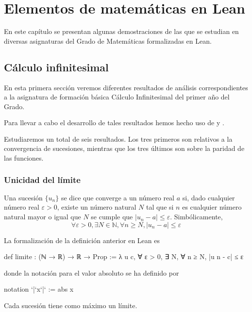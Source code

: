 \chapter{Elementos de matemáticas en Lean}

En este capítulo se presentan algunas demostraciones de las que se
estudian en diversas asignaturas del Grado de Matemáticas formalizadas
en Lean.

\section{Cálculo infinitesimal}

En esta primera sección veremos diferentes resultados de análisis
correspondientes a la asignatura de formación básica Cálculo
Infinitesimal del primer año del Grado.

Para llevar a cabo el desarrollo de tales resultados hemos hecho uso
de \cite{ML} y \cite{LP}.

Estudiaremos un total de seis resultados. Los tres primeros son relativos
a la convergencia de sucesiones, mientras que los tres últimos son sobre
la paridad de las funciones.

  
\subsection{Unicidad del límite}

\begin{definicion}\label{limite}
  Una sucesión \(\{u_n\}\) se dice que converge a un número real \(a\) si,
  dado cualquier número real \(ε > 0\), existe un número natural \(N\)
  tal que si \(n\) es cualquier número natural mayor o igual que \(N\) se
  cumple que \(|u_n-a| ≤ ε\). Simbólicamente,
  \[∀ ε > 0, ∃ N ∈ ℕ, ∀ n ≥ N, |u_n-a| ≤ ε\]
\end{definicion}

La formalización de la definición anterior en Lean es
\begin{leancode}
def limite : (ℕ → ℝ) → ℝ → Prop :=
λ u c, ∀ ε > 0, ∃ N, ∀ n ≥ N, |u n - c| ≤ ε
\end{leancode}
donde la notación para el valor absoluto se ha definido por
\begin{leancode}
notation `|`x`|` := abs x
\end{leancode}

\begin{teorema}
Cada sucesión tiene como máximo un límite.
\end{teorema}

